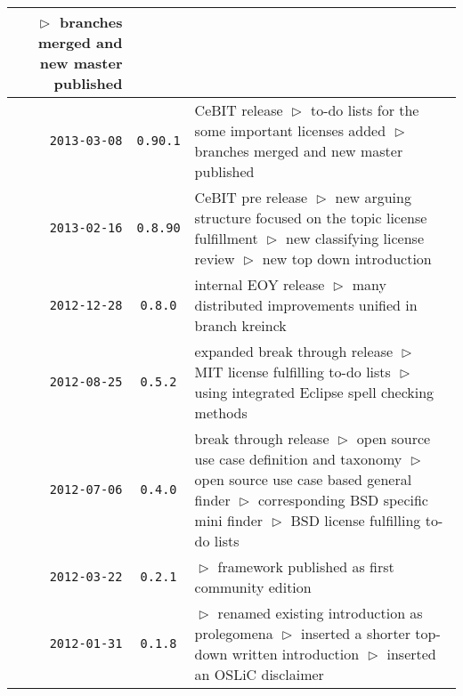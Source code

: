 \begin{table}
\begin{center}
\begin{tabular}{|r|c|p{9.4cm}|}
    $\vartriangleright$ branches merged and new master published\\
\hline
    \texttt{2013-03-08}
  & \texttt{0.90.1} 
  & CeBIT release\newline
    $\vartriangleright$ to-do lists for the some important licenses added\newline
    $\vartriangleright$ branches merged and new master published\\
\hline
    \texttt{2013-02-16}
  & \texttt{0.8.90} 
  & CeBIT pre release\newline
    $\vartriangleright$ new arguing structure focused on the topic license fulfillment\newline
    $\vartriangleright$ new classifying license review\newline   
    $\vartriangleright$ new top down introduction\\
\hline
    \texttt{2012-12-28}
  & \texttt{0.8.0} 
  & internal EOY release\newline
    $\vartriangleright$ many distributed improvements unified in branch kreinck\\
\hline
    \texttt{2012-08-25}
  & \texttt{0.5.2} 
  & expanded break through release\newline
    $\vartriangleright$ MIT license fulfilling to-do lists\newline
    $\vartriangleright$ using integrated Eclipse spell checking methods\\
\hline
    \texttt{2012-07-06}
  & \texttt{0.4.0} 
  & break through release\newline
    $\vartriangleright$ open source use case definition and taxonomy\newline 
    $\vartriangleright$ open source use case based general finder\newline 
    $\vartriangleright$ corresponding BSD specific mini finder\newline 
    $\vartriangleright$ BSD license fulfilling to-do lists\\
\hline
    \texttt{2012-03-22}
  & \texttt{0.2.1} 
  & $\vartriangleright$ framework published as first community edition\\
\hline
    \texttt{2012-01-31}
  & \texttt{0.1.8} 
  & $\vartriangleright$ renamed existing introduction as prolegomena\newline
    $\vartriangleright$ inserted a shorter top-down written introduction\newline
    $\vartriangleright$ inserted an OSLiC disclaimer\newline

\end{tabular}
\end{center}
\end{table}
